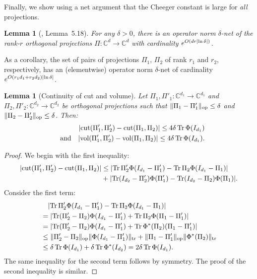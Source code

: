 \documentclass[aos]{imsart}
\newtheorem{lemma}[theorem]{Lemma}
\theoremstyle{definition}
\numberwithin{equation}{section}
\DeclareMathOperator{\op}{op}
\DeclareMathOperator{\vol}{vol}
\DeclareMathOperator{\cut}{cut}
\DeclareMathOperator{\tr}{Tr}
\DeclarePairedDelimiter{\abs}{\lvert}{\rvert}
\DeclarePairedDelimiter{\norm}{\lVert}{\rVert}
\newcommand{\C}{{\mathbb{C}}}
\begin{document}
\begin{appendix}
Finally, we show using a net argument that the Cheeger constant is large for \emph{all} projections.

\begin{lemma}[\cite{FM20}, Lemma~5.18]\label{lem:net}
For any $\delta>0$, there is an operator norm $\delta$-net of the rank-$r$ orthogonal projections $\Pi\colon \C^d \to \C^d$ with cardinality $e^{O(d r \abs{\ln\delta})}$.
\end{lemma}

As a corollary, the set of pairs of projections $\Pi_1$, $\Pi_2$ of rank $r_1$ and $r_2$, respectively, has an (elementwise) operator norm $\delta$-net of cardinality $e^{O(r_1 d_1 + r_2 d_2) \abs{\ln \delta}}$.

\begin{lemma}[Continuity of cut and volume]\label{lem:net-suffices}
Let $\Pi_1,\Pi'_1 \colon \C^{d_1}\to\C^{d_1}$ and $\Pi_2,\Pi'_2\colon\C^{d_2}\to\C^{d_2}$ be orthogonal projections such that $\norm{\Pi_1 - \Pi'_1}_{\op}\leq\delta$ and $\norm{\Pi_2 - \Pi'_2}_{\op}\leq\delta$.
Then:
\begin{align*}
  \abs{\cut(\Pi'_1,\Pi'_2) - \cut(\Pi_1,\Pi_2)} \leq 4 \delta \tr \Phi(I_{d_1}) \\
  \quad\text{and}\quad
  \abs{\vol(\Pi'_1,\Pi'_2) - \vol(\Pi_1,\Pi_2)} \leq 4 \delta \tr \Phi(I_{d_1}).
\end{align*}
\end{lemma}
\begin{proof}
We begin with the first inequality:
\begin{align*}
  \abs{\cut(\Pi'_1,\Pi'_2) - \cut(\Pi_1,\Pi_2)}
&\leq \abs{\tr \Pi'_2 \Phi(I_{d_1} - \Pi'_1) - \tr \Pi_2 \Phi(I_{d_1} - \Pi_1)} \\
&+ \abs{\tr (I_{d_2} - \Pi'_2) \Phi(\Pi'_1) - \tr (I_{d_2} - \Pi_2) \Phi(\Pi_1)}.
\end{align*}
Consider the first term:
\begin{align*}
&\quad \abs{\tr \Pi'_2 \Phi(I_{d_1} - \Pi'_1) - \tr \Pi_2 \Phi(I_{d_1} - \Pi_1)} \\
&= \abs{\tr (\Pi'_2 - \Pi_2) \Phi(I_{d_1} - \Pi'_1) + \tr \Pi_2 \Phi(\Pi_1 - \Pi'_1)} \\
&= \abs{\tr (\Pi'_2 - \Pi_2) \Phi(I_{d_1} - \Pi'_1) + \tr \Phi^*(\Pi_2) (\Pi_1 - \Pi'_1)} \\
&\leq \norm{\Pi'_2 - \Pi_2}_{\op} \norm{\Phi(I_{d_1} - \Pi'_1)}_{\operatorname{tr}} + \norm{\Pi_1 - \Pi'_1}_{\op} \norm{\Phi^*(\Pi_2)}_{\operatorname{tr}} \\
&\leq \delta \tr \Phi(I_{d_1}) + \delta \tr \Phi^*(I_{d_2})
= 2 \delta \tr \Phi(I_{d_1}).
\end{align*}
The same inequality for the second term follows by symmetry.
The proof of the second inequality is similar.
\end{proof}


\end{appendix}
\end{document}
